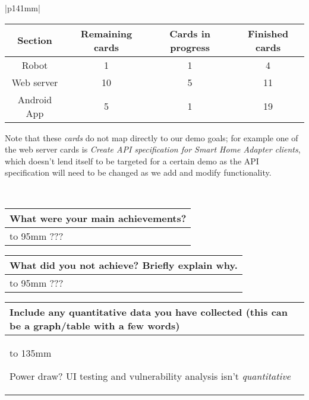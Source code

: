 \documentclass[a4paper]{article}
\newcommand{\colWidth}{141mm}
\begin{document}
\begin{center}
\begin{tabular}{|p{\colWidth}|}
		\begin{tabular}{| c || c | c | c |} \hline
			\textbf{Section} & \textbf{Remaining cards} & \textbf{Cards in progress} & \textbf{Finished cards}\\ \hline
			Robot & 1 & 1 & 4 \\
			Web server & 10 & 5 & 11 \\
			Android App & 5 & 1 & 19 \\ \hline
		\end{tabular}

		\vspace{3mm}

		Note that these \textit{cards} do not map directly to our demo goals; for example one of the web server cards is \textit{Create API specification for Smart Home Adapter clients},
		which doesn't lend itself to be targeted for a certain demo as the API specification will need to be changed as we add and modify functionality.
	
  \\
  \hline
\end{tabular}
\vskip 5mm


\begin{tabular}{|p{\colWidth}|}
	\hline
	\cellcolor{blue!25}\large
	\textbf{What were your main achievements?}
	\\ \hline
	\vtop to 95mm{
		\color{red} ???
	}
  \\
  \hline
\end{tabular}
\vskip 5mm


\begin{tabular}{|p{\colWidth}|}
	\hline
	\cellcolor{blue!25}\large
	\textbf{What did you not achieve? Briefly explain why.}
	\\ \hline
	\vtop to 95mm{
		\color{red} ???
  }
  \\
  \hline
\end{tabular}
\vskip 5mm


\begin{tabular}{|p{\colWidth}|}
	\hline
	\cellcolor{blue!25}\large
	\textbf{Include any quantitative data you have collected (this can be a graph/table with a few words)}
	\\ \hline
	\vtop to 135mm{
		\color{red} Power draw? UI testing and vulnerability analysis isn't \textit{quantitative}

}
\end{tabular}
\end{center}
\end{document}

